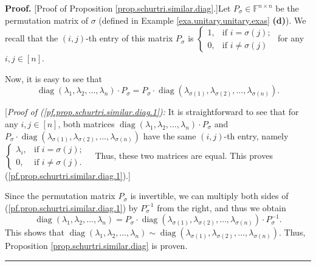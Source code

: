 \documentclass[numbers=enddot,12pt,final,onecolumn,notitlepage]{scrartcl}%
\numberwithin{exer}{subsection}
\theoremstyle{definition}
\newenvironment{proof}[1][Proof]{\noindent\textbf{#1.} }{\ \rule{0.5em}{0.5em}}
\begin{document}
\begin{proof}
[Proof of Proposition \ref{prop.schurtri.similar.diag}.]Let $P_{\sigma}%
\in\mathbb{F}^{n\times n}$ be the permutation matrix of $\sigma$ (defined in
Example \ref{exa.unitary.unitary.exas} \textbf{(d)}). We recall that the
$\left(  i,j\right)  $-th entry of this matrix $P_{\sigma}$ is $%
\begin{cases}
1, & \text{if }i=\sigma\left(  j\right)  ;\\
0, & \text{if }i\neq\sigma\left(  j\right)
\end{cases}
$ for any $i,j\in\left[  n\right]  $.

Now, it is easy to see that%
\begin{equation}
\operatorname*{diag}\left(  \lambda_{1},\lambda_{2},\ldots,\lambda_{n}\right)
\cdot P_{\sigma}=P_{\sigma}\cdot\operatorname*{diag}\left(  \lambda
_{\sigma\left(  1\right)  },\lambda_{\sigma\left(  2\right)  },\ldots
,\lambda_{\sigma\left(  n\right)  }\right)  .
\label{pf.prop.schurtri.similar.diag.1}%
\end{equation}


[\textit{Proof of (\ref{pf.prop.schurtri.similar.diag.1}):} It is
straightforward to see that for any $i,j\in\left[  n\right]  $, both matrices
$\operatorname*{diag}\left(  \lambda_{1},\lambda_{2},\ldots,\lambda
_{n}\right)  \cdot P_{\sigma}$ and $P_{\sigma}\cdot\operatorname*{diag}\left(
\lambda_{\sigma\left(  1\right)  },\lambda_{\sigma\left(  2\right)  }%
,\ldots,\lambda_{\sigma\left(  n\right)  }\right)  $ have the same $\left(
i,j\right)  $-th entry, namely $%
\begin{cases}
\lambda_{i}, & \text{if }i=\sigma\left(  j\right)  ;\\
0, & \text{if }i\neq\sigma\left(  j\right)  .
\end{cases}
$\ \ Thus, these two matrices are equal. This proves
(\ref{pf.prop.schurtri.similar.diag.1}).] \medskip

Since the permutation matrix $P_{\sigma}$ is invertible, we can multiply both
sides of (\ref{pf.prop.schurtri.similar.diag.1}) by $P_{\sigma}^{-1}$ from the
right, and thus we obtain
\[
\operatorname*{diag}\left(  \lambda_{1},\lambda_{2},\ldots,\lambda_{n}\right)
=P_{\sigma}\cdot\operatorname*{diag}\left(  \lambda_{\sigma\left(  1\right)
},\lambda_{\sigma\left(  2\right)  },\ldots,\lambda_{\sigma\left(  n\right)
}\right)  \cdot P_{\sigma}^{-1}.
\]
This shows that $\operatorname*{diag}\left(  \lambda_{1},\lambda_{2}%
,\ldots,\lambda_{n}\right)  \sim\operatorname*{diag}\left(  \lambda
_{\sigma\left(  1\right)  },\lambda_{\sigma\left(  2\right)  },\ldots
,\lambda_{\sigma\left(  n\right)  }\right)  $. Thus, Proposition
\ref{prop.schurtri.similar.diag} is proven.
\end{proof}
\end{document}
